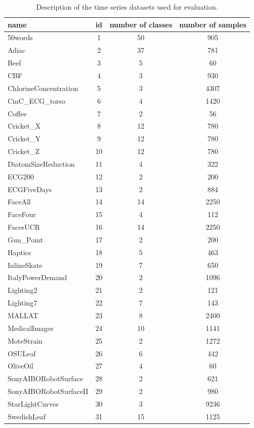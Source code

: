 \documentclass[natbib,smallextended]{svjour3}
\begin{document}
\begin{table} [h!]
\begin{center}
\caption{Description of the time series datasets used for evaluation.}
\label{didtNoda1}
\small
 \setlength{\tabcolsep}{.16667em}
\begin{tabular}{lccc}
name & id & number of classes & number of samples \\
\hline
50words &  1 & 50 &  905 \\
Adiac &  2 & 37 &  781 \\
Beef &  3 &  5 &   60 \\
CBF &  4 &  3 &  930 \\
ChlorineConcentration &  5 &  3 & 4307 \\
CinC\_ECG\_torso &  6 &  4 & 1420 \\
Coffee &  7 &  2 &   56 \\
Cricket\_X &  8 & 12 &  780 \\
Cricket\_Y &  9 & 12 &  780 \\
Cricket\_Z & 10 & 12 &  780 \\
DiatomSizeReduction & 11 &  4 &  322 \\
ECG200 & 12 &  2 &  200 \\
ECGFiveDays & 13 &  2 &  884 \\
FaceAll & 14 & 14 & 2250 \\
FaceFour & 15 &  4 &  112 \\
FacesUCR & 16 & 14 & 2250 \\
Gun\_Point & 17 &  2 &  200 \\
Haptics & 18 &  5 &  463 \\
InlineSkate & 19 &  7 &  650 \\
ItalyPowerDemand & 20 &  2 & 1096 \\
Lighting2 & 21 &  2 &  121 \\
Lighting7 & 22 &  7 &  143 \\
MALLAT & 23 &  8 & 2400 \\
MedicalImages & 24 & 10 & 1141 \\
MoteStrain & 25 &  2 & 1272 \\
OSULeaf & 26 &  6 &  442 \\
OliveOil & 27 &  4 &   60 \\
SonyAIBORobotSurface & 28 &  2 &  621 \\
SonyAIBORobotSurfaceII & 29 &  2 &  980 \\
StarLightCurves & 30 &  3 & 9236 \\
SwedishLeaf & 31 & 15 & 1125 \\

\end{tabular}
\end{center}
\end{table}
\end{document}
